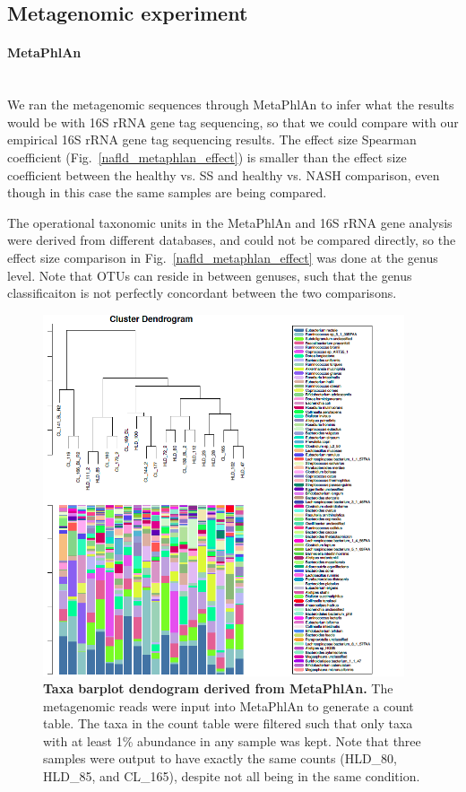 \FloatBarrier

\subsection{Metagenomic experiment}

\paragraph{MetaPhlAn}\mbox{}\\

We ran the metagenomic sequences through MetaPhlAn to infer what the results would be with 16S rRNA gene tag sequencing, so that we could compare with our empirical 16S rRNA gene tag sequencing results. The effect size Spearman coefficient (Fig.~\ref{nafld_metaphlan_effect}) is smaller than the effect size coefficient between the healthy vs. SS and healthy vs. NASH comparison, even though in this case the same samples are being compared.

The operational taxonomic units in the MetaPhlAn and 16S rRNA gene analysis were derived from different databases, and could not be compared directly, so the effect size comparison in Fig.~\ref{nafld_metaphlan_effect} was done at the genus level. Note that OTUs can reside in between genuses, such that the genus classificaiton is not perfectly concordant between the two comparisons.

\begin{figure}[h]
\begin{center}
\includegraphics[width=0.95\textwidth]{metaphlan_barplot_dendogram.png}
\caption{\textbf{Taxa barplot dendogram derived from MetaPhlAn.} The metagenomic reads were input into MetaPhlAn to generate a count table. The taxa in the count table were filtered such that only taxa with at least 1\% abundance in any sample was kept. Note that three samples were output to have exactly the same counts (HLD\_80, HLD\_85, and CL\_165), despite not all being in the same condition.}
\end{center}
\label{nafld_metaphlan_barplot}
\end{figure}

